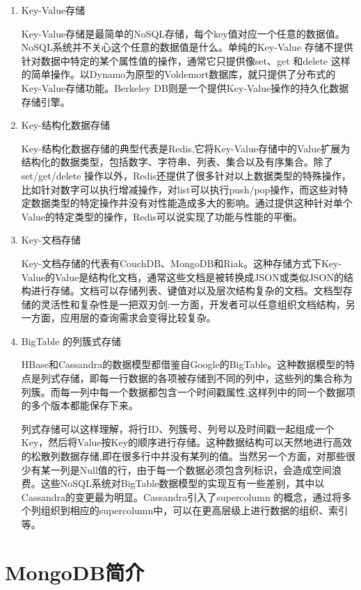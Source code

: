 \documentclass[11pt, a4paper, oneside]{ctexart}
\begin{document}
\begin{enumerate}
    \item Key-Value存储
    
Key-Value存储是最简单的NoSQL存储，每个key值对应一个任意的数据值。NoSQL系统并不关心这个任意的数据值是什么。单纯的Key-Value 存储不提供针对数据中特定的某个属性值的操作，通常它只提供像set、get 和delete 这样的简单操作\textsuperscript{\cite{ref5}}。以Dynamo为原型的Voldemort数据库，就只提供了分布式的Key-Value存储功能。Berkeley DB则是一个提供Key-Value操作的持久化数据存储引擎。
    \item Key-结构化数据存储
    
Key-结构化数据存储的典型代表是Redis,它将Key-Value存储中的Value扩展为结构化的数据类型，包括数字、字符串、列表、集合以及有序集合。除了set/get/delete 操作以外，Redis还提供了很多针对以上数据类型的特殊操作，比如针对数字可以执行增减操作，对list可以执行push/pop操作，而这些对特定数据类型的特定操作并没有对性能造成多大的影响\textsuperscript{\cite{ref6}}。通过提供这种针对单个Value的特定类型的操作，Redis可以说实现了功能与性能的平衡。
    \item Key-文档存储
    
Key-文档存储的代表有CouchDB、MongoDB和Riak。这种存储方式下Key-Value的Value是结构化文档，通常这些文档是被转换成JSON或类似JSON的结构进行存储。文档可以存储列表、键值对以及层次结构复杂的文档。文档型存储的灵活性和复杂性是一把双刃剑:一方面，开发者可以任意组织文档结构，另一方面，应用层的查询需求会变得比较复杂。
    \item BigTable 的列簇式存储
    
HBase和Cassandra的数据模型都借鉴自Google的BigTable。这种数据模型的特点是列式存储，即每一行数据的各项被存储到不同的列中，这些列的集合称为列簇。而每一列中每一个数据都包含一个时间戳属性,这样列中的同一个数据项的多个版本都能保存下来。

列式存储可以这样理解，将行ID、列簇号、列号以及时间戳一起组成一个Key，然后将Value按Key的顺序进行存储\textsuperscript{\cite{ref6}}。这种数据结构可以天然地进行高效的松散列数据存储,即在很多行中并没有某列的值。当然另一个方面，对那些很少有某一列是Null值的行，由于每一个数据必须包含列标识，会造成空间浪费。这些NoSQL系统对BigTable数据模型的实现互有一些差别，其中以Cassandra的变更最为明显。Cassandra引入了supercolumn 的概念，通过将多个列组织到相应的supercolumn中，可以在更高层级上进行数据的组织、索引等。
\end{enumerate}

\section{MongoDB简介}
\end{document}
